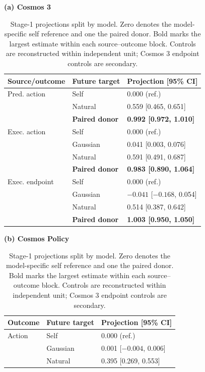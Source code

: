 \documentclass{article}
\begin{document}
\begin{table}[t]
  \caption{Stage-1 projections split by model. Zero denotes the model-specific self reference and one the paired donor. Bold marks the largest estimate within each source--outcome block. Controls are reconstructed within independent unit; Cosmos 3 endpoint controls are secondary.}
  \label{tab:directionality}
  \centering
  \scriptsize
  \begin{minipage}[t]{0.51\linewidth}
    \centering
    \textbf{(a) Cosmos 3}\\[2pt]
    \setlength{\tabcolsep}{2.5pt}
    \begin{tabular}{@{}lll@{}}
      \toprule
      Source/outcome & Future target & Projection [95\% CI] \\
      \midrule
      Pred. action & Self & 0.000 (ref.) \\
      & Natural & 0.559 [0.465, 0.651] \\
      & \textbf{Paired donor} & \textbf{0.992 [0.972, 1.010]} \\
      \midrule
      Exec. action & Self & 0.000 (ref.) \\
      & Gaussian & 0.041 [0.003, 0.076] \\
      & Natural & 0.591 [0.491, 0.687] \\
      & \textbf{Paired donor} & \textbf{0.983 [0.890, 1.064]} \\
      \midrule
      Exec. endpoint & Self & 0.000 (ref.) \\
      & Gaussian & $-0.041$ [$-0.168$, 0.054] \\
      & Natural & 0.514 [0.387, 0.642] \\
      & \textbf{Paired donor} & \textbf{1.003 [0.950, 1.050]} \\
      \bottomrule
    \end{tabular}
  \end{minipage}\hfill
  \begin{minipage}[t]{0.47\linewidth}
    \centering
    \textbf{(b) Cosmos Policy}\\[2pt]
    \setlength{\tabcolsep}{2.5pt}
    \begin{tabular}{@{}lll@{}}
      \toprule
      Outcome & Future target & Projection [95\% CI] \\
      \midrule
      Action & Self & 0.000 (ref.) \\
      & Gaussian & 0.001 [$-0.004$, 0.006] \\
      & Natural & 0.395 [0.269, 0.553] \\

\end{tabular}
\end{minipage}
\end{table}
\end{document}
